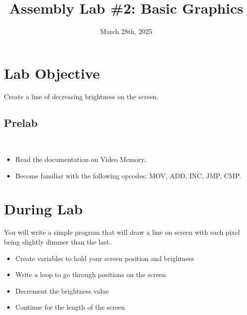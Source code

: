 \documentclass[
	12pt, %
]{fphw}
\title{Assembly Lab \#2: Basic Graphics} %
\date{March 28th, 2025} %
\institute{Elizabethtown College \\ Department of Computer Science} %
\begin{document}
\maketitle %


\section*{Lab Objective}

\begin{problem}
	Create a line of decreasing brightness on the screen.  
\end{problem}


\subsection*{Prelab}\\

\begin{itemize}
  \item Read the documentation on Video Memory.
  \item Become familiar with the following opcodes: MOV, ADD, INC, JMP, CMP.
\end{itemize}


\section*{During Lab}

\begin{problem}
	You will write a simple program that will draw a line on screen with each pixel being slightly dimmer than the last.
\end{problem}


\begin{itemize}
  \item Create variables to hold your screen position and brightness
  \item Write a loop to go through positions on the screen
  \item Decrement the brightness value
  \item Continue for the length of the screen 
\end{itemize}
\end{document}
